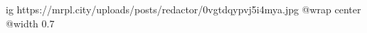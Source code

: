  
 
 
 
 

\ifcmt
  ig https://mrpl.city/uploads/posts/redactor/0vgtdqypvj5i4mya.jpg
  @wrap center
  @width 0.7
\fi
